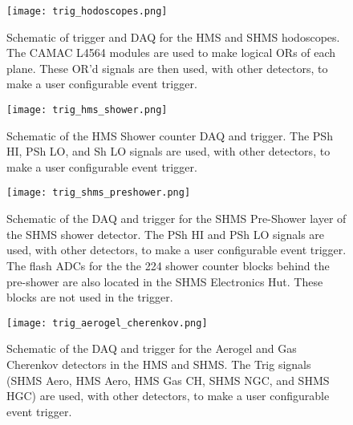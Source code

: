 {\begin{figure}
\texttt{[image: trig\_hodoscopes.png]}
\caption{\label{fig:trig_hodoscopes}
Schematic of trigger and DAQ for the HMS and SHMS hodoscopes.  The CAMAC
L4564 modules are used to make logical ORs of each plane.  These OR'd signals
are then used, with other detectors, to make a user configurable event trigger.
}
\end{figure}

\begin{figure}
\texttt{[image: trig\_hms\_shower.png]}
\caption{\label{fig:trig_hms_shower}
Schematic of the HMS Shower counter DAQ and trigger.  The PSh HI, PSh LO,
and Sh LO signals are used, with other detectors, to make a user
configurable event trigger.
}
\end{figure}

\begin{figure}
\texttt{[image: trig\_shms\_preshower.png]}
\caption{\label{fig:trig_shms_preshower}
Schematic of the DAQ and trigger for the SHMS Pre-Shower layer of the
SHMS shower detector.  The
PSh HI and PSh LO signals are used, with other detectors, to make a user
configurable event trigger.  The flash ADCs for the the 224 shower counter
blocks behind the pre-shower are also located in the SHMS Electronics Hut.
These blocks are not used in the trigger.
}
\end{figure}

\begin{figure}
\texttt{[image: trig\_aerogel\_cherenkov.png]}
\caption{\label{fig:trig_aerogel_cherenkov}
Schematic of the DAQ and trigger for the Aerogel and Gas Cherenkov
detectors in the HMS and SHMS.  The Trig signals (SHMS Aero, HMS Aero,
HMS Gas CH, SHMS NGC, and SHMS HGC) are used, with other detectors, to
make a user configurable event trigger.
}
\end{figure}


\obsolete{ %

\section{General Computer Information}

\par
In the counting room we have various computers
for DAQ, analysis, and controls.  (Control systems are described
in Chapter~\ref{chap:controls}.)
The DAQ computer's names are denoted by \mycomp{cdaqlN} and \mycomp{hcdeskN},
where N is a number.

}}
